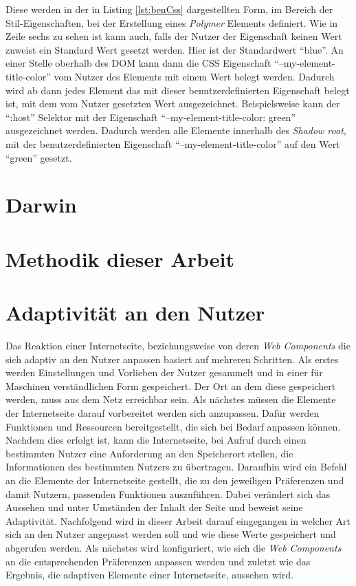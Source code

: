 \documentclass[12pt, paper=a4, bibtotoc, toc=listof, headsepline=true]{scrreprt}
\begin{document}
Diese werden in der in Listing \ref{lst:benCss} dargestellten Form, im Bereich der Stil-Eigenschaften, bei der Erstellung eines \emph{Polymer} Elements definiert. Wie in Zeile sechs zu sehen ist kann auch, falls der Nutzer der Eigenschaft keinen Wert zuweist ein Standard Wert gesetzt werden. Hier ist der Standardwert \enquote{blue}. An einer Stelle oberhalb des \ac{DOM} kann dann die \ac{CSS} Eigenschaft \enquote{--my-element-title-color} vom Nutzer des Elements mit einem Wert belegt werden. Dadurch wird ab dann jedes Element das mit dieser benutzerdefinierten Eigenschaft belegt ist, mit dem vom Nutzer gesetzten Wert ausgezeichnet. Beispielsweise kann der \enquote{:host} Selektor mit der Eigenschaft \enquote{--my-element-title-color: green} ausgezeichnet werden. Dadurch werden alle Elemente innerhalb des \emph{Shadow root}, mit der benutzerdefinierten Eigenschaft \enquote{--my-element-title-color} auf den Wert \enquote{green} gesetzt.
\chapter{Darwin}	
\chapter{Methodik dieser Arbeit}
\chapter{Adaptivität an den Nutzer}
Das Reaktion einer Internetseite, beziehungsweise von deren \emph{Web Components} die sich adaptiv an den Nutzer anpassen basiert auf mehreren Schritten. Als erstes werden Einstellungen und Vorlieben der Nutzer gesammelt und in einer für Maschinen verständlichen Form gespeichert. Der Ort an dem diese gespeichert werden, muss aus dem Netz erreichbar sein. Als nächstes müssen die Elemente der Internetseite darauf vorbereitet werden sich anzupassen. Dafür werden Funktionen und Ressourcen bereitgestellt, die sich bei Bedarf anpassen können. Nachdem dies erfolgt ist, kann die Internetseite, bei Aufruf durch einen bestimmten Nutzer eine Anforderung an den Speicherort stellen, die Informationen des bestimmten Nutzers zu übertragen. Daraufhin wird ein Befehl an die Elemente der Internetseite gestellt, die zu den jeweiligen Präferenzen und damit Nutzern, passenden Funktionen auszuführen. Dabei verändert sich das Aussehen und unter Umständen der Inhalt der Seite und beweist seine Adaptivität.\newline
Nachfolgend wird in dieser Arbeit darauf eingegangen in welcher Art sich an den Nutzer angepasst werden soll und wie diese Werte gespeichert und abgerufen werden. Als nächstes wird konfiguriert, wie sich die \emph{Web Components} an die entsprechenden Präferenzen anpassen werden und zuletzt wie das Ergebnis, die adaptiven Elemente einer Internetseite, aussehen wird.
\end{document}
